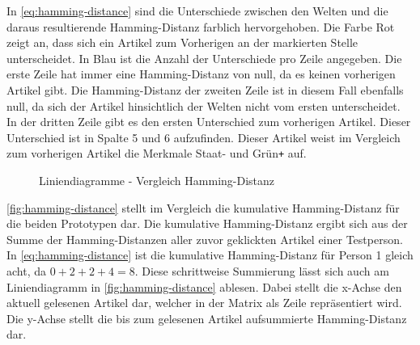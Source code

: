 In \autoref{eq:hamming-distance} sind die Unterschiede zwischen den Welten und die daraus resultierende Hamming-Distanz farblich hervorgehoben.
Die Farbe Rot zeigt an, dass sich ein Artikel zum Vorherigen an der markierten Stelle unterscheidet.
In Blau ist die Anzahl der Unterschiede pro Zeile angegeben.
Die erste Zeile hat immer eine Hamming-Distanz von null, da es keinen vorherigen Artikel gibt.
Die Hamming-Distanz der zweiten Zeile ist in diesem Fall ebenfalls null, da sich der Artikel hinsichtlich der Welten nicht vom ersten unterscheidet.
In der dritten Zeile gibt es den ersten Unterschied zum vorherigen Artikel.
Dieser Unterschied ist in Spalte 5 und 6 aufzufinden.
Dieser Artikel weist im Vergleich zum vorherigen Artikel die Merkmale Staat- und Grün\texttt{+} auf.\\

\begin{figure}[ht!]
    \centering
    \qquad
    \caption{Liniendiagramme - Vergleich Hamming-Distanz}
    \label{fig:hamming-distance}
\end{figure}

\autoref{fig:hamming-distance} stellt im Vergleich die kumulative Hamming-Distanz für die beiden Prototypen dar.
Die kumulative Hamming-Distanz ergibt sich aus der Summe der Hamming-Distanzen aller zuvor geklickten Artikel einer Testperson.
In \autoref{eq:hamming-distance} ist die kumulative Hamming-Distanz für Person 1 gleich acht, da $0 + 2 + 2 + 4 = 8$.
Diese schrittweise Summierung lässt sich auch am Liniendiagramm in \autoref{fig:hamming-distance} ablesen.
Dabei stellt die x-Achse den aktuell gelesenen Artikel dar, welcher in der Matrix als Zeile repräsentiert wird.
Die y-Achse stellt die bis zum gelesenen Artikel aufsummierte Hamming-Distanz dar.\\


